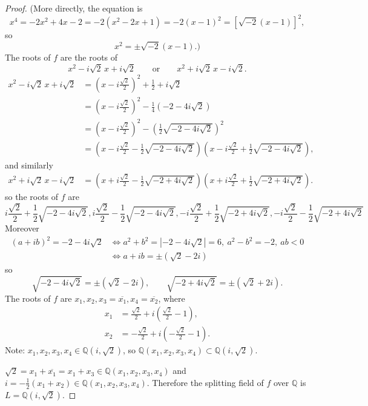 \documentclass[11pt,a4paper]{article}
\newcommand{\Q}{\mathbb{Q}}
\begin{document}
\begin{proof}
(More directly, the equation is $$x^4 = -2x^2+4x-2 = -2(x^2-2x+1) = -2(x-1)^2 = [\sqrt{-2}(x-1)]^2,$$
so
$$x^2 = \pm \sqrt{-2} ( x -1).) $$
The roots of $f$ are the roots of
$$x^2 -i\sqrt{2} \, x+ i\sqrt{2} \qquad\text{or} \qquad  x^2 + i\sqrt{2} \,x - i\sqrt{2}.$$
\begin{align*}
x^2 -i\sqrt{2} \, x+ i\sqrt{2}&= \left(x - i\frac{\sqrt{2}}{2} \right)^2 + \frac{1}{2} + i \sqrt{2}\\
&=\left(x - i\frac{\sqrt{2}}{2} \right)^2 -\frac{1}{4}\left(-2 -4i\sqrt{2}\right)\\
&=\left(x - i\frac{\sqrt{2}}{2} \right)^2 -\left( \frac{1}{2} \sqrt{-2 - 4i\sqrt{2}} \right)^2\\
&= \left(x - i\frac{\sqrt{2}}{2}  - \frac{1}{2} \sqrt{-2 - 4i\sqrt{2}} \right)  \left(x - i\frac{\sqrt{2}}{2}  + \frac{1}{2} \sqrt{-2 - 4i\sqrt{2}} \right),
\end{align*}
and similarly
\begin{align*}
x^2 + i\sqrt{2} \,x - i\sqrt{2} &= \left(x + i\frac{\sqrt{2}}{2}  - \frac{1}{2} \sqrt{-2 +4i\sqrt{2}} \right)  \left(x + i\frac{\sqrt{2}}{2}  + \frac{1}{2} \sqrt{-2 + 4i\sqrt{2}} \right).
\end{align*}
so the roots of $f$ are
$$
 i\frac{\sqrt{2}}{2}  + \frac{1}{2} \sqrt{-2 - 4i\sqrt{2}},
  i\frac{\sqrt{2}}{2}  -  \frac{1}{2} \sqrt{-2 - 4i\sqrt{2}}, 
   -i\frac{\sqrt{2}}{2}  + \frac{1}{2} \sqrt{-2 + 4i\sqrt{2}},
 -i\frac{\sqrt{2}}{2}  - \frac{1}{2} \sqrt{-2 + 4i\sqrt{2}}
$$
Moreover 
\begin{align*}
(a+ib)^2 = -2 - 4i \sqrt{2} &\iff a^2+b^2 = |-2-4 i \sqrt{2} | = 6, \ a^2 - b^2 = -2, \ ab<0\\
&\iff a+ib = \pm(\sqrt{2} - 2i)
\end{align*}
so $$ \sqrt{-2 - 4i\sqrt{2}} = \pm (\sqrt{2} - 2i), \qquad  \sqrt{-2 + 4i\sqrt{2}} = \pm(\sqrt{2} +  2i).$$
The roots of $f$ are $x_1, x_2,x_3 = \overline{x_1}, x_4 = \overline{x_2}$, where
\begin{align*}
x_1 &= \frac{\sqrt{2}}{2} + i \left(\frac{\sqrt{2}}{2} - 1 \right),\\
x_2 &= -\frac{\sqrt{2}}{2} +i \left(-\frac{\sqrt{2}}{2} - 1 \right).
\end{align*}
Note: $x_1,x_2,x_3,x_4 \in \mathbb{Q}(i,\sqrt{2})$, so $\Q(x_1,x_2,x_3,x_4) \subset \mathbb{Q}(i,\sqrt{2})$. 

$\sqrt{2} = x_1 + \overline{x_1} = x_1 + x_3 \in \Q(x_1,x_2,x_3,x_4)$ and $i = -\frac{1}{2}(x_1+x_2) \in \mathbb{Q}(x_1,x_2,x_3,x_4)$. Therefore the splitting field of $f$ over $\Q$ is $L = \Q(i,\sqrt{2})$.


\end{proof}
\end{document}
